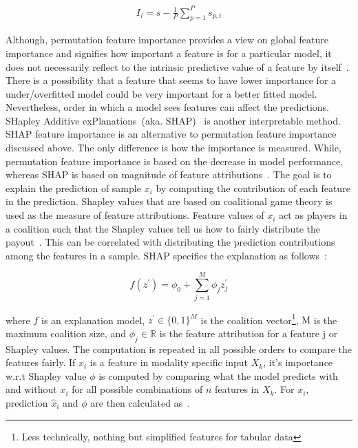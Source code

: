 \vspace{-2mm}
\begin{align}
    I_{i}=s-\frac{1}{P} \sum_{p=1}^{P} s_{p,i}
\end{align}
\fi 

\hspace*{3.5mm} Although, permutation feature importance provides a view on global feature importance and signifies how important a feature is for a particular model, it does not necessarily reflect to the intrinsic predictive value of a feature by itself~\cite{molnar2019interpretable}. There is a possibility that a feature that seems to have lower importance for a under/overfitted model could be very important for a better fitted model. Nevertheless, order in which a model sees features can affect the predictions. SHapley Additive exPlanations~(aka. SHAP)~\cite{SHAP} is another interpretable method. SHAP feature importance is an alternative to permutation feature importance discussed above. The only difference is how the importance is measured. While, permutation feature importance is based on the decrease in model performance, whereas SHAP is based on magnitude of feature attributions~\cite{molnar2019interpretable}. The goal is to explain the prediction of sample $x_i$ by computing the contribution of each feature in the prediction. Shapley values that are based on coalitional game theory is used as the measure of feature attributions. Feature values of $x_i$ act as players in a coalition such that the Shapley values tell us how to fairly distribute the  payout~\cite{molnar2019interpretable}. This can be correlated with distributing the prediction contributions among the features in a sample. SHAP specifies the explanation as follows~\cite{molnar2019interpretable}:

\begin{equation}
    f\left(z^{\prime}\right)=\phi_{0}+\sum_{j=1}^{M} \phi_{j} z_{j}^{\prime}
\end{equation}

\hspace*{3.5mm} where $f$ is an explanation model, $z^{\prime} \in\{0,1\}^{M}$ is the coalition vector\footnote{Less technically, nothing but simplified features for tabular data}, $\mathrm{M}$ is the maximum coalition size, and $\phi_{j} \in \mathbb{R}$ is the feature attribution for a feature $\mathrm{j}$ or Shapley values. The computation is repeated in all possible orders to compare the features fairly. If $x_i$ is a feature in modality specific input $X_k$, it's importance w.r.t Shapley value $\phi$ is computed by comparing what the model predicts with and without $x_i$ for all possible combinations of $n$ features in $X_k$. For $x_i$, prediction $\hat x_i$ and $\phi$ are then calculated as~\cite{NIPS2017_7062}. 

